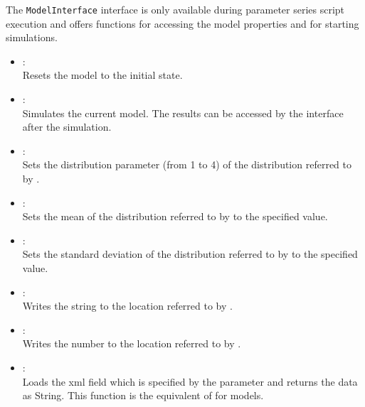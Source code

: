 The \texttt{ModelInterface} interface is only available during parameter series
script execution and offers functions for accessing the model
properties and for starting simulations.

\begin{itemize}

\item
{}:\\
Resets the model to the initial state.

\item
{}:\\
Simulates the current model.
The results can be accessed by the  interface after the simulation.

\item
{}:\\
Sets the distribution parameter  (from 1 to 4) of the distribution referred
to by .

\item
{}:\\
Sets the mean of the distribution referred to by  to the specified value.

\item
{}:\\
Sets the standard deviation of the distribution referred to by  to the specified value.  

\item
{}:\\
Writes the string  to the location referred to by .

\item
{}:\\
Writes the number  to the location referred to by .  

\item
{}:\\
Loads the xml field which is specified by the parameter and returns the data 
as String. This function is the equivalent of 
for models.


\end{itemize}
